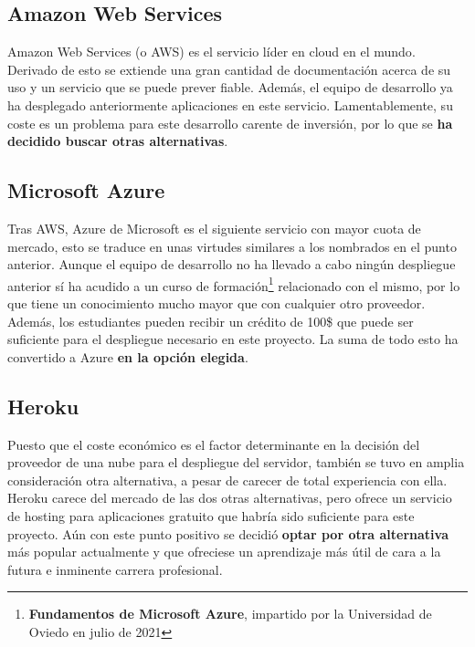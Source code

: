 \subsection{Amazon Web Services}

Amazon Web Services (o AWS) es el servicio líder en cloud en el mundo\cite{cloud2021}. Derivado de esto se extiende una gran cantidad de documentación acerca de su uso y un servicio que se puede prever fiable. Además, el equipo de desarrollo ya ha desplegado anteriormente aplicaciones en este servicio. Lamentablemente, su coste es un problema para este desarrollo carente de inversión, por lo que se \textbf{ha decidido buscar otras alternativas}.

\subsection{Microsoft Azure}

Tras AWS, Azure de Microsoft es el siguiente servicio con mayor cuota de mercado\cite{cloud2021}, esto se traduce en unas virtudes similares a los nombrados en el punto anterior. Aunque el equipo de desarrollo no ha llevado a cabo ningún despliegue anterior sí ha acudido a un curso de formación\footnote{\textbf{Fundamentos de Microsoft Azure}, impartido por la Universidad de Oviedo en julio de 2021} relacionado con el mismo, por lo que tiene un conocimiento mucho mayor que con cualquier otro proveedor. Además, los estudiantes pueden recibir un crédito de 100\$ que puede ser suficiente para el despliegue necesario en este proyecto. La suma de todo esto ha convertido a Azure \textbf{en la opción elegida}.

\subsection{Heroku}

Puesto que el coste económico es el factor determinante en la decisión del proveedor de una nube para el despliegue del servidor, también se tuvo en amplia consideración otra alternativa, a pesar de carecer de total experiencia con ella. Heroku carece del mercado de las dos otras alternativas, pero ofrece un servicio de hosting para aplicaciones gratuito que habría sido suficiente para este proyecto. Aún con este punto positivo se decidió \textbf{optar por otra alternativa} más popular actualmente y que ofreciese un aprendizaje más útil de cara a la futura e inminente carrera profesional.